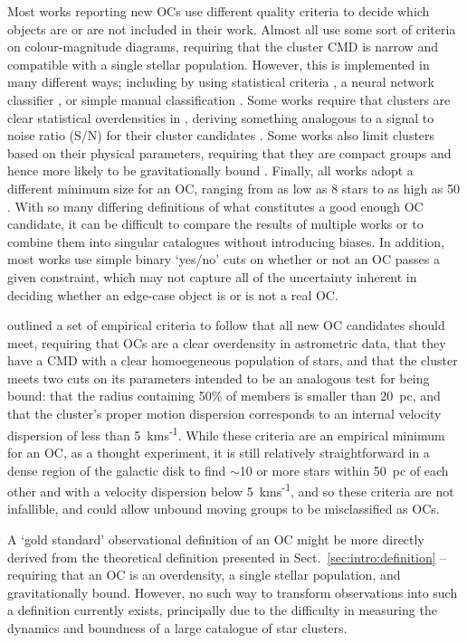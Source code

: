 Most works reporting new OCs use different quality criteria to decide which objects are or are not included in their work. Almost all use some sort of criteria on colour-magnitude diagrams, requiring that the cluster CMD is narrow and compatible with a single stellar population. However, this is implemented in many different ways; including by using statistical criteria \citep[e.g.][]{liu_catalog_2019}, a neural network classifier \citep[e.g.][]{castro-ginard_new_2018}, or simple manual classification \citep[e.g.][]{he_catalogue_2021}. Some works require that clusters are clear statistical overdensities in \gaia, deriving something analogous to a signal to noise ratio (S/N) for their cluster candidates \citep[e.g.][]{cantat-gaudin_gaia_2019}. Some works also limit clusters based on their physical parameters, requiring that they are compact groups and hence more likely to be gravitationally bound \citep[e.g.][]{liu_catalog_2019}. Finally, all works adopt a different minimum size for an OC, ranging from as low as 8 stars \citep{castro-ginard_new_2018} to as high as 50 \citep{liu_catalog_2019}. With so many differing definitions of what constitutes a good enough OC candidate, it can be difficult to compare the results of multiple works or to combine them into singular catalogues without introducing biases. In addition, most works use simple binary `yes/no' cuts on whether or not an OC passes a given constraint, which may not capture all of the uncertainty inherent in deciding whether an edge-case object is or is not a real OC.

\cite{cantat-gaudin_clusters_2020} outlined a set of empirical criteria to follow that all new OC candidates should meet, requiring that OCs are a clear overdensity in astrometric data, that they have a CMD with a clear homoegeneous population of stars, and that the cluster meets two cuts on its parameters intended to be an analogous test for being bound: that the radius containing 50\% of members is smaller than 20~pc, and that the cluster's proper motion dispersion corresponds to an internal velocity dispersion of less than 5~kms\textsuperscript{-1}. While these criteria are an empirical minimum for an OC, as a thought experiment, it is still relatively straightforward in a dense region of the galactic disk to find $\sim$10 or more stars within 50~pc of each other and with a velocity dispersion below 5~kms\textsuperscript{-1}, and so these criteria are not infallible, and could allow unbound moving groups to be misclassified as OCs.

A `gold standard' observational definition of an OC might be more directly derived from the theoretical definition presented in Sect.~\ref{sec:intro:definition} -- requiring that an OC is an overdensity, a single stellar population, and gravitationally bound. However, no such way to transform observations into such a definition currently exists, principally due to the difficulty in measuring the dynamics and boundness of a large catalogue of star clusters.


